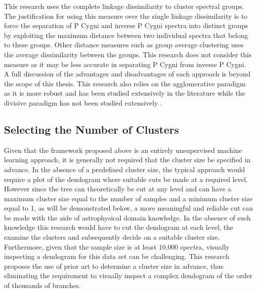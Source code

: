 This research uses the complete linkage dissimilarity to cluster spectral groups. The justification for using this measure over the single linkage dissimilarity is to force the separation of P Cygni and inverse P Cygni spectra into distinct groups by exploiting the maximum distance between two individual spectra that belong to these groups. Other distance measures such as group average clustering uses the average dissimilarity between the groups. This research does not consider this measure as it may be less accurate in separating P Cygni from inverse P Cygni. A full discussion of the advantages and disadvantages of each approach is beyond the scope of this thesis. This research also relies on the agglomerative paradigm as it is more robust and has been studied extensively in the literature while the divisive paradigm has not been studied extensively \cite{hastie2009elements}.

\subsection{Selecting the Number of Clusters}

Given that the framework proposed above is an entirely unsupervised machine learning approach, it is generally not required that the cluster size be specified in advance. In the absence of a predefined cluster size, the typical approach would require a plot of the dendogram where suitable cuts be made at a required level. However since the tree can theoretically be cut at any level and can have a maximum cluster size equal to the number of samples and a minimum cluster size equal to 1, as will be demonstrated below, a more meaningful and reliable cut can be made with the aide of astrophysical domain knowledge. In the absence of such knowledge this research would have to cut the dendogram at each level, the examine the clusters and subsequently decide on a suitable cluster size. Furthermore, given that the sample size is at least 10,000 spectra, visually inspecting a dendogram for this data set can be challenging. This research proposes the use of prior art to determine a cluster size in advance, thus eliminating the requirement to visually inspect a complex dendogram of the order of thousands of branches. 

